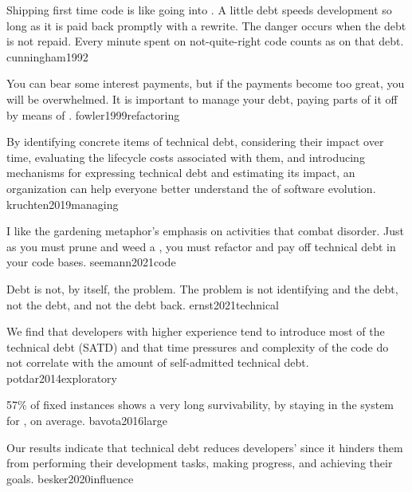 \documentclass{article}
\begin{document}

  {Shipping first time code is like going into . A little debt speeds development so long as it is paid back promptly with a rewrite. The danger occurs when the debt is not repaid. Every minute spent on not-quite-right code counts as  on that debt.}
  {cunningham1992}


  {You can bear some interest payments, but if the payments become too great, you will be overwhelmed. It is important to manage your debt, paying parts of it off by means of .}
  {fowler1999refactoring}

  {By identifying concrete items of technical debt, considering their impact over time, evaluating the lifecycle costs associated with them, and introducing mechanisms for expressing technical debt and estimating its impact, an organization can help everyone better understand the  of software evolution.}
  {kruchten2019managing}

  {I like the gardening metaphor's emphasis on activities that combat disorder. Just as you must prune and weed a , you must refactor and pay off technical debt in your code bases.}
  {seemann2021code}

  {Debt is not, by itself, the problem. The problem is not identifying and  the debt, not  the debt, and not  the debt back.}
  {ernst2021technical}


  {We find that developers with higher experience tend to introduce most of the  technical debt (SATD) and that time pressures and complexity of the code do not correlate with the amount of self-admitted technical debt.}
  {potdar2014exploratory}

  {57\% of fixed instances shows a very long survivability, by staying in the system for , on average.}
  {bavota2016large}

  {Our results indicate that technical debt reduces developers'  since it hinders them from performing their development tasks, making progress, and achieving their goals.}
  {besker2020influence}
\end{document}
